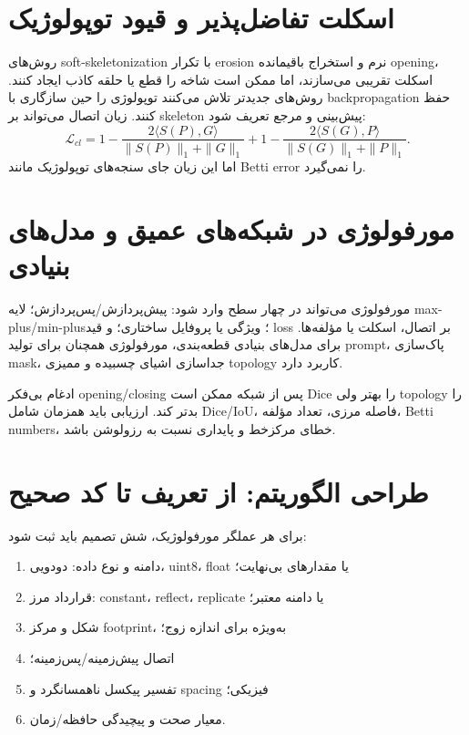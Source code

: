\documentclass[12pt,openany,oneside]{book}
\begin{document}
\section{اسکلت تفاضل‌پذیر و قیود توپولوژیک}
روش‌های soft-skeletonization با تکرار erosion نرم و استخراج باقیمانده opening، اسکلت تقریبی می‌سازند، اما
ممکن است شاخه را قطع یا حلقه کاذب ایجاد کنند. روش‌های جدیدتر تلاش می‌کنند توپولوژی را حین سازگاری با
backpropagation حفظ کنند. زیان اتصال می‌تواند بر skeleton پیش‌بینی و مرجع تعریف شود:
\begin{equation}
\mathcal L_{cl}=1-\frac{2\langle S(P),G\rangle}{\|S(P)\|_1+\|G\|_1}
+1-\frac{2\langle S(G),P\rangle}{\|S(G)\|_1+\|P\|_1}.
\end{equation}
اما این زیان جای سنجه‌های توپولوژیک مانند Betti error را نمی‌گیرد.

\section{مورفولوژی در شبکه‌های عمیق و مدل‌های بنیادی}
مورفولوژی می‌تواند در چهار سطح وارد شود: پیش‌پردازش/پس‌پردازش؛ لایه max-plus/min-plus؛ ویژگی یا پروفایل
ساختاری؛ و قید loss بر اتصال، اسکلت یا مؤلفه‌ها. برای مدل‌های بنیادی قطعه‌بندی، مورفولوژی همچنان برای تولید
prompt، پاک‌سازی mask، جداسازی اشیای چسبیده و ممیزی topology کاربرد دارد.

\begin{researchbox}
ادغام بی‌فکر opening/closing پس از شبکه ممکن است Dice را بهتر ولی topology را بدتر کند. ارزیابی باید همزمان
شامل Dice/IoU، فاصله مرزی، تعداد مؤلفه، Betti numbers، خطای مرکزخط و پایداری نسبت به رزولوشن باشد.
\end{researchbox}

\section{طراحی الگوریتم: از تعریف تا کد صحیح}
برای هر عملگر مورفولوژیک، شش تصمیم باید ثبت شود:
\begin{enumerate}
\item دامنه و نوع داده: دودویی، uint8، float یا مقدارهای بی‌نهایت؛
\item قرارداد مرز: constant، reflect، replicate یا دامنه معتبر؛
\item شکل و مرکز footprint، به‌ویژه برای اندازه زوج؛
\item اتصال پیش‌زمینه/پس‌زمینه؛
\item تفسیر پیکسل ناهمسانگرد و spacing فیزیکی؛
\item معیار صحت و پیچیدگی حافظه/زمان.
\end{enumerate}
\end{document}
